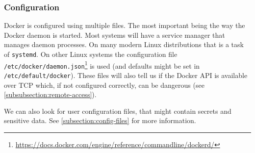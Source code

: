 \subsubsection{Configuration}\label{subsubsection:configuration}
Docker is configured using multiple files. The most important being the way the Docker daemon is started. Most systems will have a service manager that manages daemon processes. On many modern Linux distributions that is a task of \lstinline{systemd}. On other Linux systems the configuration file \lstinline{/etc/docker/daemon.json}\footnote{\url{https://docs.docker.com/engine/reference/commandline/dockerd/}} is used (and defaults might be set in \lstinline{/etc/default/docker}). These files will also tell us if the Docker API is available over TCP which, if not configured correctly, can be dangerous (see \autoref{subsubsection:remote-access}).

\medskip

We can also look for user configuration files, that might contain secrets and sensitive data. See \autoref{subsection:config-files} for more information.
